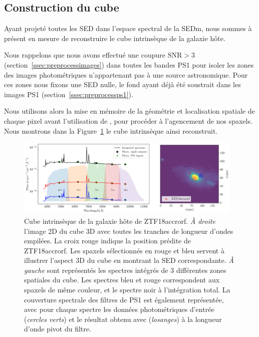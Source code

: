 \documentclass[../main/main.tex]{subfiles}
\begin{document}
\subsection{Construction du cube}

Ayant projeté toutes les SED dans l'espace spectral de la SEDm,
nous sommes à présent en mesure de reconstruire le cube intrinsèque
de la galaxie hôte.

Nous rappelons que nous avons effectué une coupure $\text{SNR}>3$ (section~\ref{ssec:preprocessimages}) dans toutes
les bandes PS1 pour isoler les zones des images photométriques
n'appartenant pas à une source astronomique. Pour ces zones nous fixons
une SED nulle, le fond ayant déjà été soustrait dans les images
PS1 (section~\ref{ssec:preprocessps1}).

Nous utilisons alors la mise en mémoire de la géométrie et localisation
spatiale de chaque pixel avant l'utilisation de \cigale, pour procéder
à l'agencement de nos spaxels.
Nous montrons dans la Figure~\ref{fig:intcube_ZTF18accrorf} le cube intrinsèque
ainsi reconstruit.

\begin{figure}[ht]
  \centering
  \includegraphics[width=0.97\textwidth]{../figures/05_sedfit/intcube_ZTF18accrorf.png}
  \caption[Cube intrinsèque de la galaxie hôte de ZTF18accrorf]{Cube
    intrinsèque de la galaxie hôte de ZTF18accrorf. \textit{À droite}
    l'image 2D du cube 3D avec toutes les tranches de longueur d'ondes
    empilées. La croix rouge indique la position prédite de
    ZTF18accrorf. Les spaxels sélectionnés en rouge et bleu servent à
    illustrer l'aspect 3D du cube en montrant la SED
    correspondante. \textit{À gauche} sont représentés les spectres intégrés de 3
    différentes zones spatiales du cube. Les spectres bleu et rouge
    correspondent aux spaxels de même couleur, et le spectre noir à
    l'intégration total. La couverture spectrale des filtres de PS1 est
    également représentée, avec pour chaque spectre les données
  photométriques d'entrée (\textit{cercles verts}) et le résultat obtenu avec
  \cigale (\textit{losanges}) à la longueur d'onde pivot du filtre.}\label{fig:intcube_ZTF18accrorf}
\end{figure}
\end{document}
